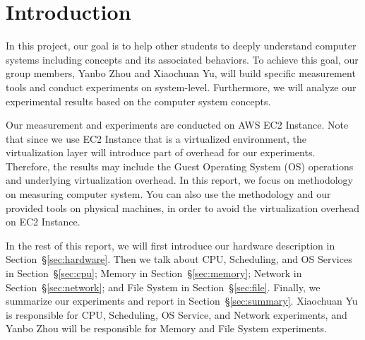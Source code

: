 \section{Introduction}
\label{sec:intro}
In this project, our goal is to help other students to deeply understand computer systems including concepts and its associated behaviors. To achieve this goal, our group members, Yanbo Zhou and Xiaochuan Yu, will build specific measurement tools and conduct experiments on system-level. Furthermore, we will analyze our experimental results based on the computer system concepts.

Our measurement and experiments are conducted on AWS EC2 Instance. Note that since we use EC2 Instance that is a virtualized environment, the virtualization layer will introduce part of overhead for our experiments. Therefore, the results may include the Guest Operating System (OS) operations and underlying virtualization overhead. In this report, we focus on methodology on measuring computer system. You can also use the methodology and our provided tools on physical machines, in order to avoid the virtualization overhead on EC2 Instance.

In the rest of this report, we will first introduce our hardware description in Section~{\S\ref{sec:hardware}}. Then we talk about CPU, Scheduling, and OS Services in Section~{\S\ref{sec:cpu}}; Memory in Section~{\S\ref{sec:memory}}; Network in Section~{\S\ref{sec:network}}; and File System in Section~{\S\ref{sec:file}}. Finally, we summarize our experiments and report in Section~{\S\ref{sec:summary}}. Xiaochuan Yu is responsible for CPU, Scheduling, OS Service, and Network experiments, and Yanbo Zhou will be responsible for Memory and File System experiments.
